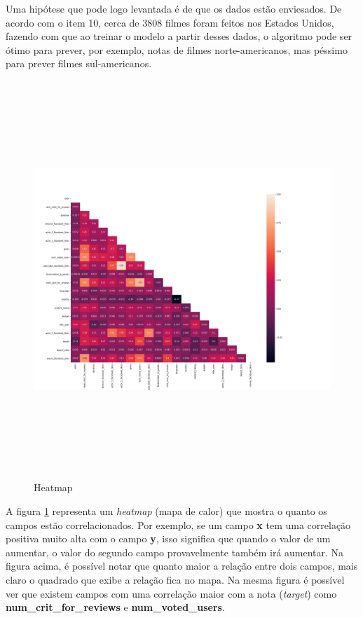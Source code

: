 Uma hipótese que pode logo levantada é de que os dados estão enviesados. De acordo com o item 10, cerca de 3808 filmes foram feitos nos Estados Unidos, fazendo com que ao treinar o modelo a partir desses dados, o algoritmo pode ser ótimo para prever, por exemplo, notas de filmes norte-americanos, mas péssimo para prever filmes sul-americanos.

\begin{figure}[H]
\centering
\includegraphics[height=15cm]{imagens/heatmap.png}
\caption{Heatmap}
\label{heatmap}
\end{figure}

A figura \ref{heatmap} representa um \textit{heatmap} (mapa de calor) que mostra o quanto os campos estão correlacionados. Por exemplo, se um campo \textbf{x} tem uma correlação positiva muito alta com o campo \textbf{y}, isso significa que quando o valor de um aumentar, o valor do segundo campo provavelmente também irá aumentar. Na figura acima, é possível notar que quanto maior a relação entre dois campos, mais claro o quadrado que exibe a relação fica no mapa. 
Na mesma figura é possível ver que existem campos com uma correlação maior com a nota (\textit{target}) como \textbf{num\_crit\_for\_reviews} e \textbf{num\_voted\_users}. 

